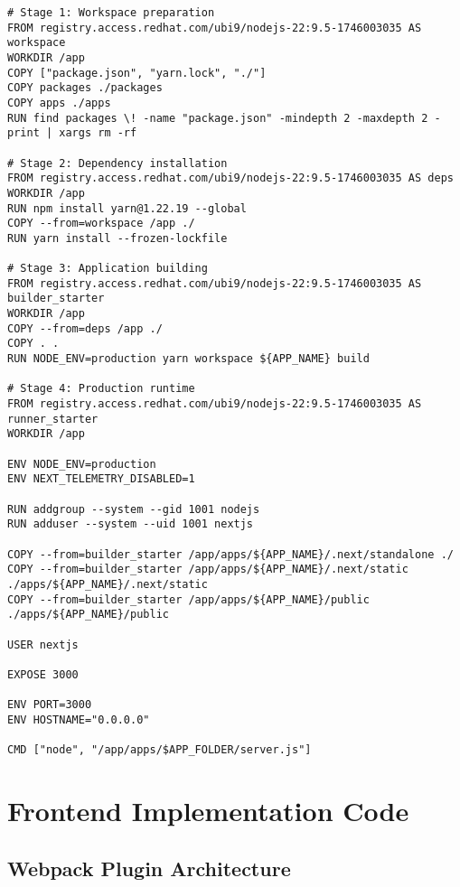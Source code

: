 \begin{lstlisting}[caption={Multi-Stage Docker Build Process}, captionpos=b, breaklines=true]
# Stage 1: Workspace preparation
FROM registry.access.redhat.com/ubi9/nodejs-22:9.5-1746003035 AS workspace
WORKDIR /app
COPY ["package.json", "yarn.lock", "./"]
COPY packages ./packages
COPY apps ./apps
RUN find packages \! -name "package.json" -mindepth 2 -maxdepth 2 -print | xargs rm -rf

# Stage 2: Dependency installation
FROM registry.access.redhat.com/ubi9/nodejs-22:9.5-1746003035 AS deps
WORKDIR /app
RUN npm install yarn@1.22.19 --global
COPY --from=workspace /app ./
RUN yarn install --frozen-lockfile

# Stage 3: Application building
FROM registry.access.redhat.com/ubi9/nodejs-22:9.5-1746003035 AS builder_starter
WORKDIR /app
COPY --from=deps /app ./
COPY . .
RUN NODE_ENV=production yarn workspace ${APP_NAME} build

# Stage 4: Production runtime
FROM registry.access.redhat.com/ubi9/nodejs-22:9.5-1746003035 AS runner_starter
WORKDIR /app

ENV NODE_ENV=production
ENV NEXT_TELEMETRY_DISABLED=1

RUN addgroup --system --gid 1001 nodejs
RUN adduser --system --uid 1001 nextjs

COPY --from=builder_starter /app/apps/${APP_NAME}/.next/standalone ./
COPY --from=builder_starter /app/apps/${APP_NAME}/.next/static ./apps/${APP_NAME}/.next/static
COPY --from=builder_starter /app/apps/${APP_NAME}/public ./apps/${APP_NAME}/public

USER nextjs

EXPOSE 3000

ENV PORT=3000
ENV HOSTNAME="0.0.0.0"

CMD ["node", "/app/apps/$APP_FOLDER/server.js"]
\end{lstlisting}

\section{Frontend Implementation Code}
\label{appendix:frontend_code}

\subsection{Webpack Plugin Architecture}
\label{appendix:webpack_plugin}

